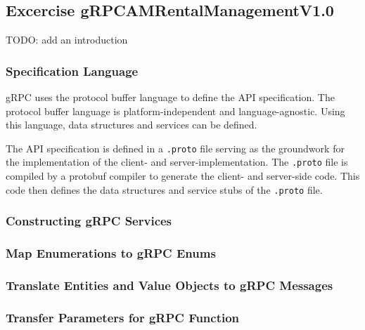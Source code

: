 \subsection{Excercise gRPCAMRentalManagementV1.0}
TODO: add an introduction

\subsubsection*{Specification Language}
gRPC uses the protocol buffer language to define the API specification.
The protocol buffer language is platform-independent and language-agnostic.
Using this language, data structures and services can be defined.

The API specification is defined in a \texttt{.proto} file serving as the groundwork for the implementation of the client- and server-implementation.
The \texttt{.proto} file is compiled by a protobuf compiler to generate the client- and server-side code.
This code then defines the data structures and service stubs of the \texttt{.proto} file.


\subsubsection*{Constructing gRPC Services}

\subsubsection*{Map Enumerations to gRPC Enums}

\subsubsection*{Translate Entities and Value Objects to gRPC Messages}

\subsubsection*{Transfer Parameters for gRPC Function}